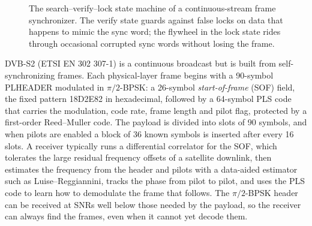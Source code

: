 \begin{figure}[htbp]\centering
{}
\caption{The search--verify--lock state machine of a continuous-stream frame synchronizer. The
verify state guards against false locks on data that happens to mimic the sync word; the flywheel
in the lock state rides through occasional corrupted sync words without losing the frame.}
\label{fig:ch10_frame_fsm}
\end{figure}

\begin{inpractice}
DVB-S2 (ETSI EN 302 307-1) is a continuous broadcast but is built from self-synchronizing frames. Each
physical-layer frame begins with a 90-symbol PLHEADER modulated in $\pi/2$-BPSK: a 26-symbol
\emph{start-of-frame} (SOF) field, the fixed pattern 18D2E82 in hexadecimal, followed by a 64-symbol
PLS code that carries the modulation, code rate, frame length and pilot flag, protected by a
first-order Reed--Muller code. The payload is divided into slots of 90 symbols, and when pilots are
enabled a block of 36 known symbols is inserted after every 16 slots. A receiver typically runs a
differential correlator for the SOF, which tolerates the large residual frequency offsets of a
satellite downlink, then estimates the frequency from the header and pilots with a data-aided
estimator such as Luise--Reggiannini, tracks the phase from pilot to pilot, and uses the PLS code to
learn how to demodulate the frame that follows. The $\pi/2$-BPSK header can be received at SNRs well
below those needed by the payload, so the receiver can always find the frames, even when it cannot
yet decode them.
\end{inpractice}

